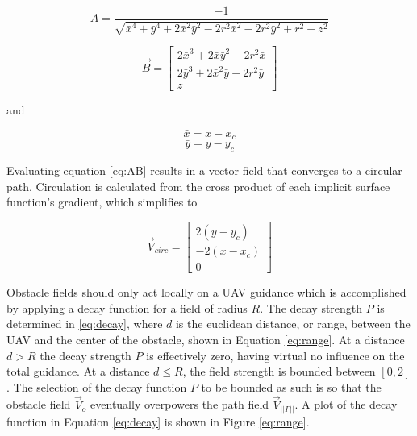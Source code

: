 \documentclass[numbered,pdftex]{ohio-etd}
\begin{document}
\begin{equation}
A = \dfrac{-1}{\sqrt{\bar{x}^4+\bar{y}^4+2\bar{x}^2\bar{y}^2-2r^2\bar{x}^2-2r^2\bar{y}^2+r^2+z^2}}
\end{equation}

\begin{equation}
\overrightarrow{B} = \begin{bmatrix} 2\bar{x}^3+2\bar{x}\bar{y}^2-2r^2\bar{x} \\ 2\bar{y}^3+2\bar{x}^2\bar{y}-2r^2\bar{y} \\z \end{bmatrix}
\end{equation}

\noindent
and


\begin{equation}
\bar{x} = x - x_c
\end{equation}
\begin{equation}
\bar{y} = y - y_c
\end{equation}


Evaluating equation \ref{eq:AB} results in a vector field that converges to a circular path. Circulation is calculated from the cross product of each implicit surface function's gradient, which simplifies to



\begin{equation}\label{eq:vcirc_circle}
\overrightarrow{V}_{circ} =  \begin{bmatrix}  2(y-y_c) \\[6pt] -2(x-x_c) \\[6pt] 0\end{bmatrix}
\end{equation}

Obstacle fields should only act locally on a UAV guidance which is accomplished by applying a decay function for a field of radius $R$. The decay strength $P$ is determined in \ref{eq:decay}, where $d$ is the euclidean distance, or range, between the UAV and the center of the obstacle, shown in Equation \ref{eq:range}. At a distance $d>R$ the decay strength $P$ is effectively zero, having virtual no influence on the total guidance. At a distance $d\leq R$, the field strength is bounded between $[0,2]$. The selection of the decay function $P$ to be bounded as such is so that the obstacle field $\overrightarrow{V}_o$ eventually overpowers the path field $\overrightarrow{V}_{||P||}$. A plot of the decay function in Equation \ref{eq:decay} is shown in Figure \ref{eq:range}.
\end{document}
